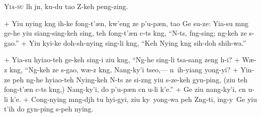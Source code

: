 \header
\lettrine{Y}{ia-su} l\oo h j\y n, ku-du tao Z-keh peng-zing.
\par
\hspace{1ex}
+	Yiu nying k\oo ng ih-ke fong-t'\ae n, kw'eng ze p'u-p\ae n, tao Ge su-ze: Yia-su m\oo ng ge-he yiu siang-sing-keh sing, teh fong-t'\ae n c\y-ts k\oo ng, ``N-ts, f\oo ng-sing; ng-keh ze s\oo-gao.''
+	Yiu kyi-ke doh-sh\y-nying sing-li k\oo ng, ``Keh Nying k\oo ng sih-doh shih-wa.''
\par
+	Yia-su hyiao-teh ge-keh sing-i ziu k\oo ng, ``Ng-he sing-li tsa-sang zeng \oo h-i?
+	W\ae-z k\oo ng, ``Ng-keh ze s\oo-gao, w\ae-z k\oo ng, Nang-ky'i tseo,--- n\oo\ ih-yiang y\y ong-yi?
+	Yin-ze peh ng-he hyiao-teh Nying-keh N-ts ze si-z\oo ng yiu s\oo-ze-keh gy\y n-ping, (ziu teh fong-t'\ae n c\y-ts k\oo ng,) Nang-ky'i, do p'u-p\ae n c\y n u-li k'e.''
+	Ge ziu nang-ky'i, c\y n u-li k'e.
+	Cong-nying m\oo ng-dj\oo h tu hyi-gyi, ziu ky\y{}\y ong-wa peh Z\oo ng-ti, ing-y\y\ Ge yiu t'ih do gy\y n-ping s-peh nying.
\par

